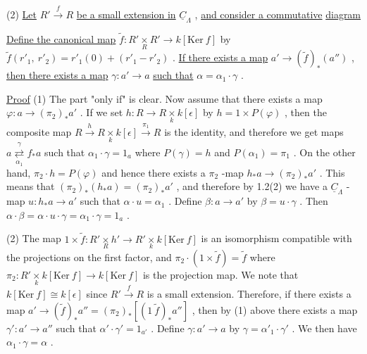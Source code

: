 (2)  \underline{Let}  $R' \xrightarrow{\ f\ } R$  \underline{be a small extension in}  $\underline{C}_{\Lambda}$  , \underline{and consider a commutative} \underline{diagram}

\begin{center}
\end{center}
\underline{Define the canonical map}  $\tilde{f} : R' \underset{R}{\times} R' \longrightarrow k[\mathrm{Ker}\ f]$  by  $\tilde{f}(r'_1,\ r'_2) = r'_1(0)+(r'_1-r'_2)$ . \underline{If there exists a map}  $a' \longrightarrow (\tilde{f})_*(a'')$  , \underline{then there exists a map}  $\gamma: a' \longrightarrow a$ \underline{such that}  $\alpha = \alpha_1 \cdot \gamma$  .

\underline{Proof}  (1) The part  "only if"  is clear. Now assume that there exists a map $\varphi : a \longrightarrow (\pi_2)_* a'$  . If we set  $h : R \longrightarrow R \underset{k}{\times} k[\epsilon]$  by  $h = 1 \times P(\varphi)$  , then the composite map  $R \xrightarrow{\ h\ } R \underset{k}{\times} k[\epsilon] \xrightarrow{\ \pi_1\ } R$  is the identity, and therefore we get maps  $a \overset{\gamma}{\underset{\alpha_1}{\rightleftarrows}} f_* a$  such that  $\alpha_1 \cdot \gamma = 1_a$  where  $P(\gamma) = h$  and  $P(\alpha_1) = \pi_1$  . On the other hand,  $\pi_2 \cdot h = P(\varphi)$  and hence there exists a  $\pi_2$ -map $h_* a \longrightarrow (\pi_2)_* a'$  . This means that  $(\pi_2)_*(h_* a) = (\pi_2)_* a'$  , and therefore by 1.2(2) we have a  $\underline{C}_{\Lambda}$ -map  $u : h_* a \longrightarrow a'$  such that  $\alpha \cdot u = \alpha_1$  . Define $\beta : a \longrightarrow a'$  by  $\beta = u \cdot \gamma$  . Then  $\alpha \cdot \beta = \alpha \cdot u \cdot \gamma = \alpha_1 \cdot \gamma = 1_a$  .

(2) The map  $1 \times \tilde{f} : R' \underset{R}{\times} h' \longrightarrow R' \underset{k}{\times} k[\mathrm{Ker}\ f]$  is an isomorphism compatible with the projections on the first factor, and  $\pi_2 \cdot (1 \times \tilde{f}) = \tilde{f}$  where $\pi_2 : R' \underset{k}{\times} k[\mathrm{Ker}\ f] \longrightarrow k[\mathrm{Ker}\ f]$  is the projection map. We note that $k[\mathrm{Ker}\ f] \cong k[\epsilon]$  since  $R' \xrightarrow{\ f\ } R$  is a small extension. Therefore, if there exists a map  $a' \longrightarrow (\tilde{f})_* a'' = (\pi_2)_* [(1\ \tilde{f})_* a'']$  , then by (1) above there exists a map  $\gamma': a' \longrightarrow a''$  such that  $\alpha' \cdot \gamma' = 1_{a'}$  . Define  $\gamma : a' \longrightarrow a$ by  $\gamma = \alpha'_1 \cdot \gamma'$  . We then have  $\alpha_1 \cdot \gamma = \alpha$  .



